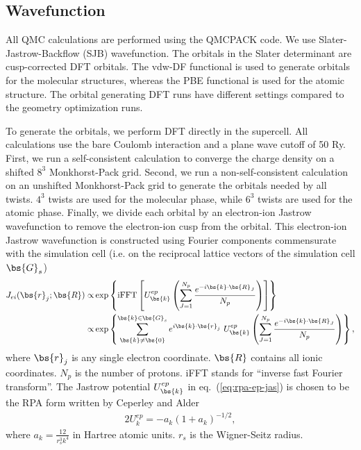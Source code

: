 \subsection{Wavefunction}

All QMC calculations are performed using the QMCPACK code. We use Slater-Jastrow-Backflow (SJB) wavefunction. The orbitals in the Slater determinant are cusp-corrected DFT orbitals. The vdw-DF functional is used to generate orbitals for the molecular structures, whereas the PBE functional is used for the atomic structure. The orbital generating DFT runs have different settings compared to the geometry optimization runs.

To generate the orbitals, we perform DFT directly in the supercell. All calculations use the bare Coulomb interaction and a plane wave cutoff of 50 Ry. First, we run a self-consistent calculation to converge the charge density on a shifted $8^3$ Monkhorst-Pack grid. Second, we run a non-self-consistent calculation on an unshifted Monkhorst-Pack grid to generate the orbitals needed by all twists. $4^3$ twists are used for the molecular phase, while $6^3$ twists are used for the atomic phase. Finally, we divide each orbital by an electron-ion Jastrow wavefunction to remove the electron-ion cusp from the orbital. This electron-ion Jastrow wavefunction is constructed using Fourier components commensurate with the simulation cell (i.e. on the reciprocal lattice vectors of the simulation cell $\bs{G}_s$)
\begin{align}
J_{ei}(\bs{r}_j; \bs{R}) \propto& \exp\left\{ \text{iFFT}\left[ 
U_{\bs{k}}^{ep}  \left(\sum\limits_{J=1}^{N_p} \frac{e^{-i\bs{k}\cdot\bs{R}_J}}{N_p}  \right)
\right] \right\} \nonumber\\
\propto& \exp\left\{ 
\sum\limits_{\bs{k}\neq\bs{0}}^{\bs{k}\in\bs{G}_s} e^{i\bs{k}\cdot\bs{r}_j}~
U_{\bs{k}}^{ep} 
\left(\sum\limits_{J=1}^{N_p} \frac{e^{-i\bs{k}\cdot\bs{R}_J}}{N_p}  \right)
\right\},\label{eq:rpa-ep-jas}
\end{align}
where $\bs{r}_j$ is any single electron coordinate. $\bs{R}$ contains all ionic coordinates. $N_p$ is the number of protons. iFFT stands for ``inverse fast Fourier transform''. The Jastrow potential $U_{\bs{k}}^{ep}$ in eq.~(\ref{eq:rpa-ep-jas}) is chosen to be the RPA form written by Ceperley and Alder
\begin{align}
2U^{ep}_k = -a_k(1+a_k)^{-1/2},
\end{align}
where $a_k=\frac{12}{r_s^3k^4}$ in Hartree atomic units. $r_s$ is the Wigner-Seitz radius.

